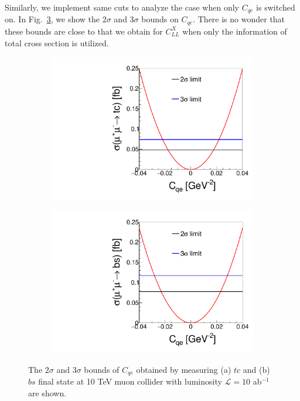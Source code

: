 \documentclass[a4paper,11pt]{article}
\begin{document}
Similarly, we implement same cuts to analyze the case when only $C_{qe}$ is switched on. 
In Fig.~\ref{fig:cqe1d}, we show the $2\sigma$ and $3\sigma$ bounds on $C_{qe}$. 
There is no wonder that these bounds are close to that we obtain for $C^{X}_{LL}$ when only the information of total cross section is utilized.

\begin{figure}[htbp]
  \centering
  \captionsetup[sub]{font=large}
  \begin{subfigure}[t]{0.45\textwidth}
     \includegraphics[width=\linewidth]{cqetc.pdf}
     \caption{}
     \label{fig:clltc1d}
  \end{subfigure}
  \begin{subfigure}[t]{0.45\textwidth}
     \includegraphics[width=\linewidth]{cqebs.pdf}
     \caption{}
     \label{fig:cllbs1d}
  \end{subfigure}
  \caption{The $2\sigma$ and $3\sigma$ bounds of $C_{qe}$ obtained by measuring (a) $tc$ and (b) $bs$ final state at 10 TeV muon collider with luminosity $\mathcal{L}=10$ ab$^{-1}$ are shown.}\label{fig:cqe1d}
\end{figure}
\end{document}
